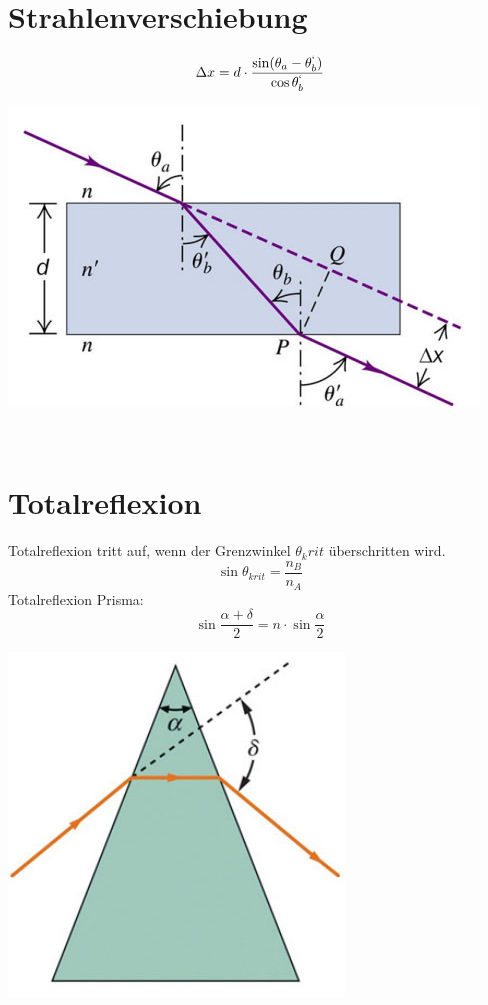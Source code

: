 \section{Strahlenverschiebung}
\[
	\Delta x = d \cdot \frac{ \sin (\theta_a -\theta_b ^`)}{\cos \theta_b ^`}
\]
\begin{center}
	\includegraphics[scale = 0.3]{../fig/strahlenverschiebung.jpg}
\end{center}
\

\section{Totalreflexion}
Totalreflexion tritt auf, wenn der Grenzwinkel $\theta_krit$ überschritten wird.
\[
	\sin \theta_{krit} = \frac{n_B}{n_A}
\]
Totalreflexion Prisma:
\[
	\sin\frac{\alpha+\delta}{2} = n\cdot \sin \frac{\alpha}{2}
\]
\begin{center}
	\includegraphics[scale = 0.2]{../fig/tr_prisma.jpg}
\end{center}
\
